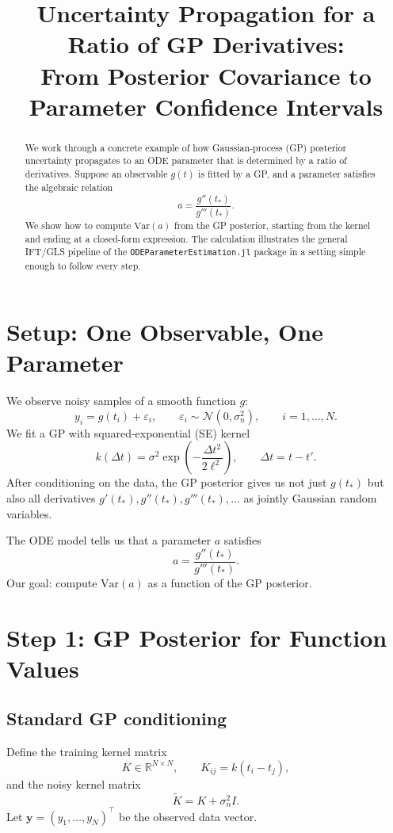 \documentclass[11pt]{article}
\title{Uncertainty Propagation for a Ratio of GP Derivatives:\\
From Posterior Covariance to Parameter Confidence Intervals}
\author{}
\date{}
\begin{document}
\maketitle

\begin{abstract}
We work through a concrete example of how Gaussian-process (GP) posterior uncertainty propagates to an ODE parameter that is determined by a ratio of derivatives.
Suppose an observable $g(t)$ is fitted by a GP, and a parameter satisfies the algebraic relation
\[
a = \frac{g''(t_*)}{g'''(t_*)}.
\]
We show how to compute $\mathrm{Var}(a)$ from the GP posterior, starting from the kernel and ending at a closed-form expression.
The calculation illustrates the general IFT/GLS pipeline of the \texttt{ODEParameterEstimation.jl} package in a setting simple enough to follow every step.
\end{abstract}

\tableofcontents

\section{Setup: One Observable, One Parameter}

We observe noisy samples of a smooth function $g$:
\[
y_i = g(t_i) + \varepsilon_i, \qquad \varepsilon_i \sim \mathcal{N}(0, \sigma_n^2), \qquad i = 1, \dots, N.
\]
We fit a GP with squared-exponential (SE) kernel
\[
k(\Delta t) = \sigma^2 \exp\!\left( -\frac{\Delta t^2}{2\ell^2} \right), \qquad \Delta t = t - t'.
\]
After conditioning on the data, the GP posterior gives us not just $g(t_*)$ but also all derivatives $g'(t_*), g''(t_*), g'''(t_*), \dots$ as jointly Gaussian random variables.

The ODE model tells us that a parameter $a$ satisfies
\[
a = \frac{g''(t_*)}{g'''(t_*)}.
\]
Our goal: compute $\mathrm{Var}(a)$ as a function of the GP posterior.

\section{Step 1: GP Posterior for Function Values}

\subsection{Standard GP conditioning}

Define the training kernel matrix
\[
K \in \mathbb{R}^{N \times N}, \qquad K_{ij} = k(t_i - t_j),
\]
and the noisy kernel matrix
\[
\tilde{K} = K + \sigma_n^2 I.
\]
Let $\mathbf{y} = (y_1, \dots, y_N)^\top$ be the observed data vector.
\end{document}
